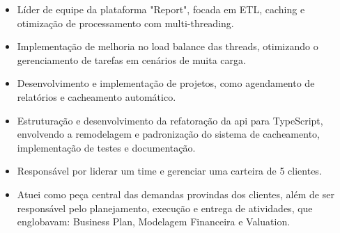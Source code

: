 	\begin{itemize}
            \item Líder de equipe da plataforma "Report", focada em ETL, caching e otimização de processamento com multi-threading.
            \item Implementação de melhoria no load balance das threads, otimizando o gerenciamento de tarefas em cenários de muita carga.
            \item Desenvolvimento e implementação de projetos, como agendamento de relatórios e cacheamento automático.
            \item Estruturação e desenvolvimento da refatoração da api para TypeScript, envolvendo a remodelagem e padronização do sistema de cacheamento, implementação de testes e documentação.
	\end{itemize}
	
	\medskip

	\begin{itemize}
		\item Responsável por liderar um time e gerenciar uma carteira de 5 clientes.
        \item Atuei como peça central das demandas provindas dos clientes, além de ser responsável pelo planejamento, execução e entrega de atividades, que englobavam: Business Plan, Modelagem Financeira e Valuation.
	\end{itemize}
